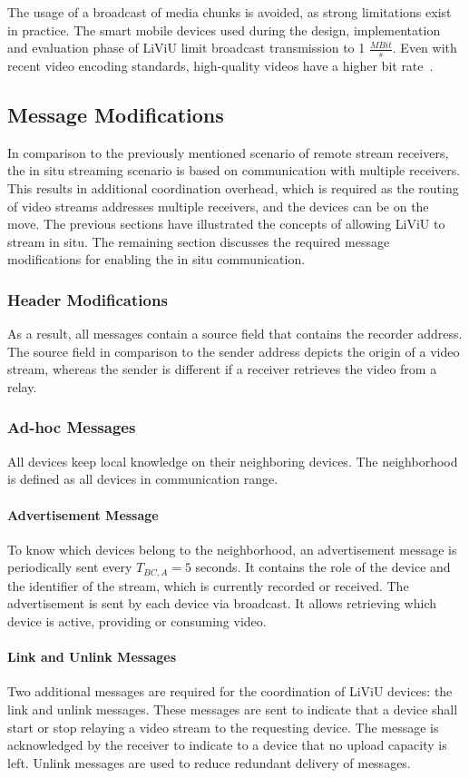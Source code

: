 The usage of a broadcast of media chunks is avoided, as strong limitations exist in practice. 
The smart mobile devices used during the design, implementation and evaluation phase of \ac{LiViU} limit broadcast transmission to 1 $\frac{MBit}{s}$.
Even with recent video encoding standards, high-quality videos have a higher bit rate~\cite{Sullivan2012}.
\subsection{Message Modifications}
In comparison to the previously mentioned scenario of remote stream receivers, the in situ streaming scenario is based on communication with multiple receivers.
This results in additional coordination overhead, which is required as the routing of video streams addresses multiple receivers, and the devices can be on the move.
The previous sections have illustrated the concepts of allowing \ac{LiViU} to stream in situ.
The remaining section discusses the required message modifications for enabling the in situ communication.
\subsubsection{Header Modifications}
As a result, all messages contain a source field that contains the recorder address.
The source field in comparison to the sender address depicts the origin of a video stream, whereas the sender is different if a receiver retrieves the video from a relay.
\subsubsection{Ad-hoc Messages}
All devices keep local knowledge on their neighboring devices. 
The neighborhood is defined as all devices in communication range.
\paragraph{Advertisement Message}
To know which devices belong to the neighborhood, an advertisement message is periodically sent every $T_{BC,A}= 5$ seconds.
It contains the role of the device and the identifier of the stream, which is currently recorded or received.
The advertisement is sent by each device via broadcast.
It allows retrieving which device is active, providing or consuming video.
\paragraph{Link and Unlink Messages}
Two additional messages are required for the coordination of \ac{LiViU} devices: the link and unlink messages.
These messages are sent to indicate that a device shall start or stop relaying a video stream to the requesting device.
The message is acknowledged by the receiver to indicate to a device that no upload capacity is left.
Unlink messages are used to reduce redundant delivery of messages. 
